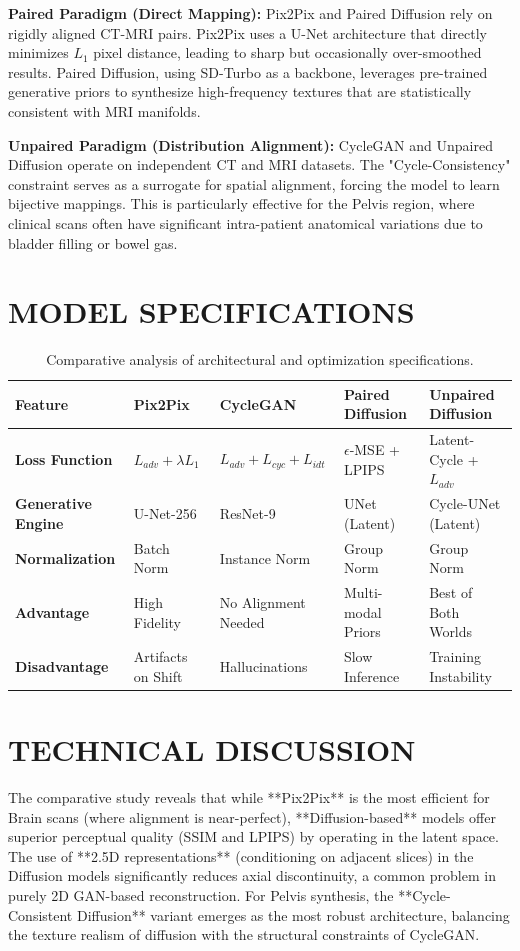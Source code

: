 \documentclass[10pt,a4paper]{article}
\begin{document}
\textbf{Paired Paradigm (Direct Mapping):} Pix2Pix and Paired Diffusion rely on rigidly aligned CT-MRI pairs. Pix2Pix uses a U-Net architecture that directly minimizes $L_1$ pixel distance, leading to sharp but occasionally over-smoothed results. Paired Diffusion, using SD-Turbo as a backbone, leverages pre-trained generative priors to synthesize high-frequency textures that are statistically consistent with MRI manifolds.

\textbf{Unpaired Paradigm (Distribution Alignment):} CycleGAN and Unpaired Diffusion operate on independent CT and MRI datasets. The "Cycle-Consistency" constraint serves as a surrogate for spatial alignment, forcing the model to learn bijective mappings. This is particularly effective for the Pelvis region, where clinical scans often have significant intra-patient anatomical variations due to bladder filling or bowel gas.

\section{MODEL SPECIFICATIONS}
\begin{table}[H]
\centering
\scriptsize
\renewcommand{\arraystretch}{1.2}
\begin{tabularx}{\textwidth}{lYYYY}
\toprule
\textbf{Feature} & \textbf{Pix2Pix} & \textbf{CycleGAN} & \textbf{Paired Diffusion} & \textbf{Unpaired Diffusion} \\
\midrule
\textbf{Loss Function} & $L_{adv} + \lambda L_1$ & $L_{adv} + L_{cyc} + L_{idt}$ & $\epsilon$-MSE + LPIPS & Latent-Cycle + $L_{adv}$ \\
\textbf{Generative Engine} & U-Net-256 & ResNet-9 & UNet (Latent) & Cycle-UNet (Latent) \\
\textbf{Normalization} & Batch Norm & Instance Norm & Group Norm & Group Norm \\
\textbf{Advantage} & High Fidelity & No Alignment Needed & Multi-modal Priors & Best of Both Worlds \\
\textbf{Disadvantage} & Artifacts on Shift & Hallucinations & Slow Inference & Training Instability \\
\bottomrule
\end{tabularx}
\caption{Comparative analysis of architectural and optimization specifications.}
\end{table}

\section{TECHNICAL DISCUSSION}
The comparative study reveals that while **Pix2Pix** is the most efficient for Brain scans (where alignment is near-perfect), **Diffusion-based** models offer superior perceptual quality (SSIM and LPIPS) by operating in the latent space. The use of **2.5D representations** (conditioning on adjacent slices) in the Diffusion models significantly reduces axial discontinuity, a common problem in purely 2D GAN-based reconstruction. For Pelvis synthesis, the **Cycle-Consistent Diffusion** variant emerges as the most robust architecture, balancing the texture realism of diffusion with the structural constraints of CycleGAN.
\end{document}

